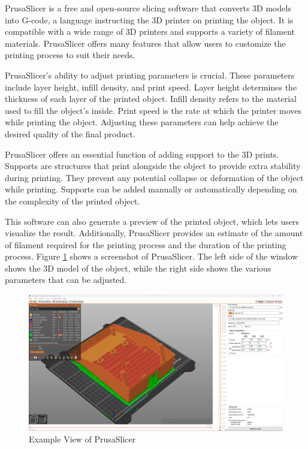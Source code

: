 PrusaSlicer is a free and open-source slicing software that converts 3D models into G-code, a language instructing the 3D printer on printing the object. It is compatible with a wide range of 3D printers and supports a variety of filament materials. PrusaSlicer offers many features that allow users to customize the printing process to suit their needs.

PrusaSlicer's ability to adjust printing parameters is crucial. These parameters include layer height, infill density, and print speed. Layer height determines the thickness of each layer of the printed object. Infill density refers to the material used to fill the object's inside. Print speed is the rate at which the printer moves while printing the object. Adjusting these parameters can help achieve the desired quality of the final product.

PrusaSlicer offers an essential function of adding support to the 3D prints. Supports are structures that print alongside the object to provide extra stability during printing. They prevent any potential collapse or deformation of the object while printing. Supports can be added manually or automatically depending on the complexity of the printed object.

This software can also generate a preview of the printed object, which lets users visualize the result. Additionally, PrusaSlicer provides an estimate of the amount of filament required for the printing process and the duration of the printing process. Figure \ref{fig:prusa_slicer} shows a screenshot of PrusaSlicer. The left side of the window shows the 3D model of the object, while the right side shows the various parameters that can be adjusted.

\begin{figure}
  \centering
  \includegraphics[width=0.8\linewidth]{texs/Part1/chapter1/image/prusaslicer.png}
  \caption{Example View of PrusaSlicer}
  \label{fig:prusa_slicer}
\end{figure}


